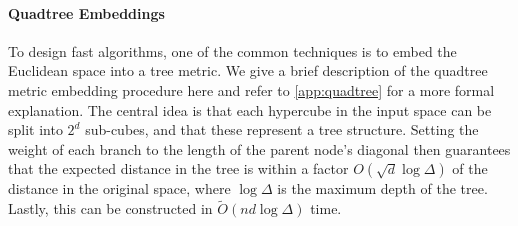 \paragraph*{Quadtree Embeddings}

To design fast algorithms, one of the common techniques is to embed the Euclidean space into a tree metric.  We give a brief description of the quadtree metric
embedding procedure here and refer to \cref{app:quadtree} for a more formal explanation.  The central idea is that each hypercube in the input space can be
split into $2^d$ sub-cubes, and that these represent a tree structure. Setting the weight of each branch to the length of the parent node's diagonal
then guarantees that the expected distance in the tree is within a factor $O(\sqrt{d} \log \Delta)$ of the distance in the original space, where $\log \Delta$
is the maximum depth of the tree. Lastly, this can be constructed in $\tilde{O}(nd \log \Delta)$ time.
